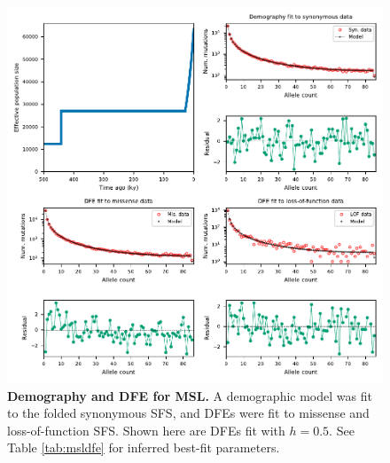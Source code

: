 \documentclass[]{article}
\begin{document}
\begin{figure}[ht!]
    \centering
    \includegraphics{../figures/msl_demography_dfes}
    \caption{
        \textbf{Demography and DFE for MSL.} A demographic model was fit to
        the folded synonymous SFS, and DFEs were fit to missense and loss-of-function
        SFS. Shown here are DFEs fit with \(h=0.5\). See Table \ref{tab:msldfe} for
        inferred best-fit parameters.
    }
    \label{fig:msldemogdfe}
\end{figure}
\end{document}
